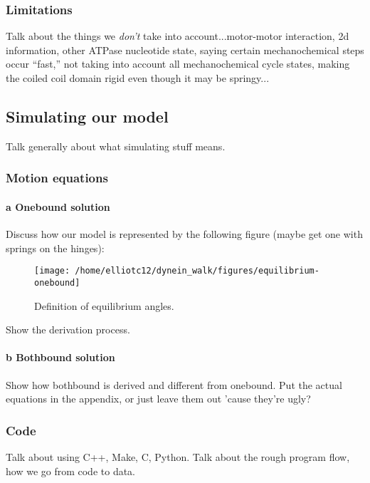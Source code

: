 \documentclass[10pt]{article} %
\begin{document}
\subsubsection{Limitations}
Talk about the things we \textit{don't} take into account...motor-motor interaction, 2d information,
other ATPase nucleotide state, saying certain mechanochemical steps occur ``fast,'' not taking into
account all mechanochemical cycle states, making the coiled coil domain rigid even though it may be
springy...

\subsection{Simulating our model}
Talk generally about what simulating stuff means.\\
\subsubsection{Motion equations}

\paragraph{a Onebound solution}
Discuss how our model is represented by the following figure (maybe get one with springs on the
hinges):\\

\begin{figure}
  \centering
  \texttt{[image: /home/elliotc12/dynein\_walk/figures/equilibrium-onebound]}
  \caption{Definition of equilibrium angles.}
  \label{fig:eq_angles}
\end{figure}

Show the derivation process.\\

\paragraph{b Bothbound solution}
Show how bothbound is derived and different from onebound. Put the actual equations in the appendix,
or just leave them out 'cause they're ugly?\\

\subsubsection{Code}
Talk about using C++, Make, C, Python. Talk about the rough program flow, how we go from code to
data.\\
\end{document}

